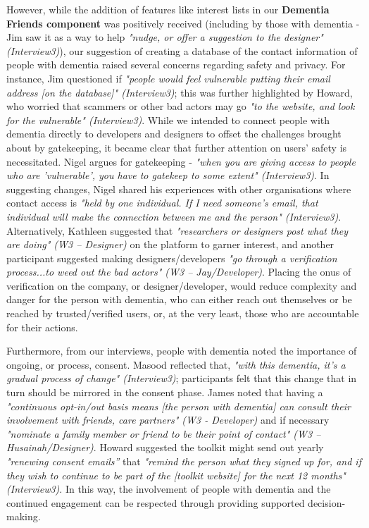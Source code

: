 However, while the addition of features like interest lists in our \textbf{Dementia Friends component} was positively received (including by those with dementia - Jim saw it as a way to help \textit{"nudge, or offer a suggestion to the designer" (Interview3)}), our suggestion of creating a database of the contact information of people with dementia raised several concerns regarding safety and privacy. For instance, Jim questioned if \textit{"people would feel vulnerable putting their email address [on the database]" (Interview3)}; this was further highlighted by Howard, who worried that scammers or other bad actors may go \textit{"to the website, and look for the vulnerable" (Interview3)}. While we intended to connect people with dementia directly to developers and designers to offset the challenges brought about by gatekeeping, it became clear that further attention on users’ safety is necessitated. Nigel argues for gatekeeping - \textit{"when you are giving access to people who are 'vulnerable', you have to gatekeep to some extent" (Interview3)}. In suggesting changes, Nigel shared his experiences with other organisations where contact access is \textit{"held by one individual. If I need someone's email, that individual will make the connection between me and the person" (Interview3)}. Alternatively, Kathleen suggested that \textit{"researchers or designers post what they are doing" (W3 – Designer)} on the platform to garner interest, and another participant suggested making designers/developers \textit{"go through a verification process...to weed out the bad actors" (W3 – Jay/Developer)}. Placing the onus of verification on the company, or designer/developer, would reduce complexity and danger for the person with dementia, who can either reach out themselves or be reached by trusted/verified users, or, at the very least, those who are accountable for their actions. 

Furthermore, from our interviews, people with dementia noted the importance of ongoing, or process, consent. Masood reflected that, \textit{"with this dementia, it's a gradual process of change" (Interview3)}; participants felt that this change that in turn should be mirrored in the consent phase. James noted that having a \textit{"continuous opt-in/out basis means [the person with dementia] can consult their involvement with friends, care partners" (W3 - Developer)} and if necessary \textit{"nominate a family member or friend to be their point of contact" (W3 – Husainah/Designer)}. Howard suggested the toolkit might send out yearly \textit{"renewing consent emails”} that \textit{"remind the person what they signed up for, and if they wish to continue to be part of the [toolkit website] for the next 12 months" (Interview3)}. In this way, the involvement of people with dementia and the continued engagement can be respected through providing supported decision-making. 

